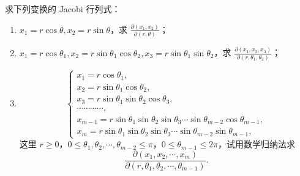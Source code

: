\begin{xreferenceproblem}[7]
求下列变换的 Jacobi 行列式：
  \begin{enumerate}[label=(\arabic*)]
    \item $x_1=r\cos\theta,x_2=r\sin\theta$，求 $\frac{\partial(x_1,x_2)}{\partial(r,\theta)}$；
    \item $x_1=r\cos\theta_1,x_2=r\sin\theta_1\cos\theta_2,x_3=r\sin\theta_1\sin\theta_2$，求 $\frac{\partial(x_1,x_2,x_3)}{\partial(r,\theta_1,\theta_2)}$；
    \item
    \[
      \begin{cases}
        x_1=r\cos\theta_1,\\
        x_2=r\sin\theta_1\cos\theta_2,\\
        x_3=r\sin\theta_1\sin\theta_2\cos\theta_3,\\
        \cdots\cdots\cdots\cdots,\\
        x_{m-1}=r\sin\theta_1\sin\theta_2\sin\theta_3\cdots\sin\theta_{m-2}\cos\theta_{m-1},\\
        x_m=r\sin\theta_1\sin\theta_2\sin\theta_3\cdots\sin\theta_{m-2}\sin\theta_{m-1},
      \end{cases}
    \]
    这里 $r\ge0$，$0\le\theta_1,\theta_2,\cdots,\theta_{m-2}\le\pi$，$0\le\theta_{m-1}\le2\pi$，试用数学归纳法求
    \[
      \frac{\partial(x_1,x_2,\cdots,x_m)}{\partial(r,\theta_1,\theta_2,\cdots,\theta_{m-1})}.
    \]
  \end{enumerate}
\end{xreferenceproblem}
